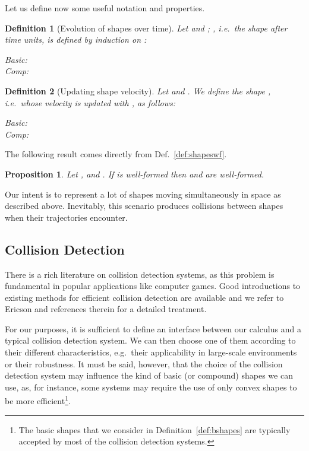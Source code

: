 \documentclass[11pt]{article}
\newtheorem{definition}{Definition}
\newtheorem{proposition}{Proposition}
\begin{document}
Let us define now some useful notation and properties.

\begin{definition}[Evolution of shapes over time]
\label{def:shapemoving}
Let  and ; , i.e.\ the shape  after  time
units, is defined by induction on :
\begin{tabbing}
Basic: \quad \= \\
Comp: \> 
\end{tabbing}
\end{definition}


\begin{definition}[Updating shape velocity]
\label{def:shape-velocity}
Let  and . We define the shape , i.e.\
 whose velocity is updated with , as follows:

\begin{tabbing}
Basic: \quad \= \\
Comp: \> 
\end{tabbing}
\end{definition}

The following result comes directly from Def.~\ref{def:shapeswf}.

\begin{proposition}
\label{prop:shapes-wellformedness}
Let ,  and . If  is
well-formed then  and  are well-formed.
\end{proposition}

Our intent is to represent a lot of shapes moving simultaneously in space as described above.
Inevitably, this scenario produces collisions between shapes when their trajectories encounter.

\subsection{Collision Detection}
\label{sec:collisiondetection}
There is a rich literature on collision detection systems, as this problem is fundamental in popular applications like computer games. Good introductions to existing methods for efficient collision detection are available and we refer to Ericson \cite{Ericson2005} and references therein for a detailed treatment.

For our purposes, it is sufficient to define an interface between our calculus and a typical collision detection system. We can then choose one of them according to their different characteristics, e.g.\ their applicability in large-scale environments or their robustness. It must be said, however, that the choice of the collision detection system may influence the kind of basic (or compound) shapes we can use, as, for instance, some systems may require the use of only convex shapes to be more efficient\footnote{The basic shapes that we consider in Definition~\ref{def:bshapes} are typically accepted by most of the collision detection systems.}.
\end{document}
